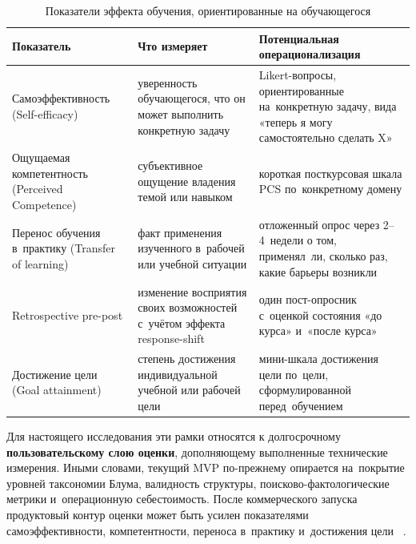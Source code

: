 \begin{table}[H]
  \centering
  \small
  \setlength{\tabcolsep}{3pt}
  \renewcommand{\arraystretch}{1.12}
  \caption{Показатели эффекта обучения, ориентированные на обучающегося}
  \label{tab:learner-centered-metrics}
  \begin{tabular}{|
    >{\raggedright\arraybackslash}P{4.25cm}|
    >{\raggedright\arraybackslash}P{5.10cm}|
    >{\raggedright\arraybackslash}P{6.05cm}|}
  \hline
  \textbf{Показатель} & \textbf{Что измеряет} & \textbf{Потенциальная операционализация} \\
  \hline
  Самоэффективность (Self-efficacy)
    & уверенность обучающегося, что он может выполнить конкретную задачу
    & Likert-вопросы, ориентированные на~конкретную задачу,
      вида
      «теперь я могу самостоятельно сделать X» \\
  \hline
  Ощущаемая компетентность (Perceived Competence)
    & субъективное ощущение владения темой или навыком
    & короткая посткурсовая шкала PCS по~конкретному домену \\
  \hline
  Перенос обучения в~практику (Transfer of learning)
    & факт применения изученного в~рабочей или учебной ситуации
    & отложенный опрос через 2–4~недели о том, применял~ли, сколько раз,
      какие барьеры возникли \\
  \hline
  Retrospective pre-post
    & изменение восприятия своих возможностей с~учётом эффекта
      response-shift
    & один пост-опросник с~оценкой состояния
      «до курса» и~«после курса» \\
  \hline
  Достижение цели (Goal attainment)
    & степень достижения индивидуальной учебной или рабочей цели
    & мини-шкала достижения цели по~цели, сформулированной
      перед~обучением \\
  \hline
\end{tabular}
\end{table}

Для настоящего исследования эти рамки относятся к долгосрочному
\textbf{пользовательскому слою оценки}, дополняющему выполненные технические измерения.
Иными словами, текущий MVP по-прежнему опирается на~покрытие уровней
таксономии Блума, валидность структуры, поисково-фактологические
метрики и~операционную себестоимость. После коммерческого запуска
продуктовый контур оценки может быть усилен показателями
самоэффективности, компетентности, переноса в~практику и~достижения цели
~\cite{bandura_self_efficacy_2006, pcs_sdt_2026,
kirkpatrick_model_2026, shilts_retrospective_2008,
shogren_gas_2021}.

